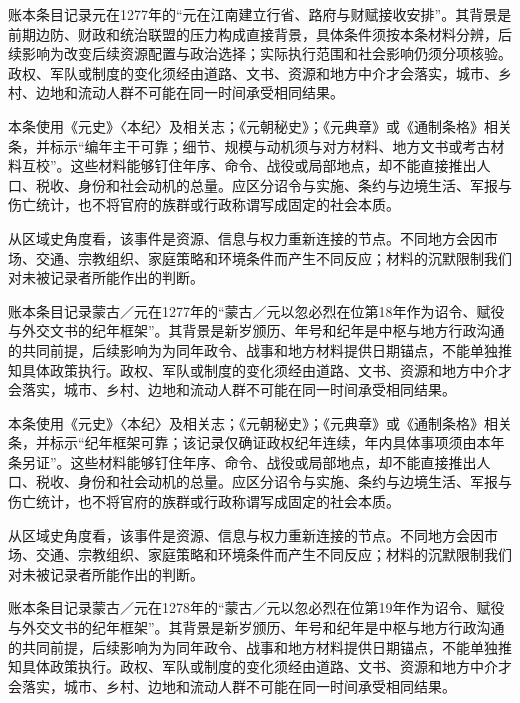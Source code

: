账本条目记录元在1277年的“元在江南建立行省、路府与财赋接收安排”。其背景是前期边防、财政和统治联盟的压力构成直接背景，具体条件须按本条材料分辨，后续影响为改变后续资源配置与政治选择；实际执行范围和社会影响仍须分项核验。政权、军队或制度的变化须经由道路、文书、资源和地方中介才会落实，城市、乡村、边地和流动人群不可能在同一时间承受相同结果。

本条使用《元史》〈本纪〉及相关志；《元朝秘史》；《元典章》或《通制条格》相关条，并标示“编年主干可靠；细节、规模与动机须与对方材料、地方文书或考古材料互校”。这些材料能够钉住年序、命令、战役或局部地点，却不能直接推出人口、税收、身份和社会动机的总量。应区分诏令与实施、条约与边境生活、军报与伤亡统计，也不将官府的族群或行政称谓写成固定的社会本质。

从区域史角度看，该事件是资源、信息与权力重新连接的节点。不同地方会因市场、交通、宗教组织、家庭策略和环境条件而产生不同反应；材料的沉默限制我们对未被记录者所能作出的判断。

账本条目记录蒙古／元在1277年的“蒙古／元以忽必烈在位第18年作为诏令、赋役与外交文书的纪年框架”。其背景是新岁颁历、年号和纪年是中枢与地方行政沟通的共同前提，后续影响为为同年政令、战事和地方材料提供日期锚点，不能单独推知具体政策执行。政权、军队或制度的变化须经由道路、文书、资源和地方中介才会落实，城市、乡村、边地和流动人群不可能在同一时间承受相同结果。

本条使用《元史》〈本纪〉及相关志；《元朝秘史》；《元典章》或《通制条格》相关条，并标示“纪年框架可靠；该记录仅确证政权纪年连续，年内具体事项须由本年条另证”。这些材料能够钉住年序、命令、战役或局部地点，却不能直接推出人口、税收、身份和社会动机的总量。应区分诏令与实施、条约与边境生活、军报与伤亡统计，也不将官府的族群或行政称谓写成固定的社会本质。

从区域史角度看，该事件是资源、信息与权力重新连接的节点。不同地方会因市场、交通、宗教组织、家庭策略和环境条件而产生不同反应；材料的沉默限制我们对未被记录者所能作出的判断。

账本条目记录蒙古／元在1278年的“蒙古／元以忽必烈在位第19年作为诏令、赋役与外交文书的纪年框架”。其背景是新岁颁历、年号和纪年是中枢与地方行政沟通的共同前提，后续影响为为同年政令、战事和地方材料提供日期锚点，不能单独推知具体政策执行。政权、军队或制度的变化须经由道路、文书、资源和地方中介才会落实，城市、乡村、边地和流动人群不可能在同一时间承受相同结果。

